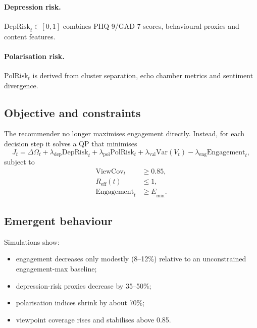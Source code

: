 \documentclass[11pt]{article}
\begin{document}
\paragraph{Depression risk.}
$\mathrm{DepRisk}_t\in[0,1]$ combines PHQ-9/GAD-7 scores, behavioural proxies and content features.

\paragraph{Polarisation risk.}
$\mathrm{PolRisk}_t$ is derived from cluster separation, echo chamber metrics and sentiment divergence.

\subsection{Objective and constraints}

The recommender no longer maximises engagement directly. Instead, for each decision step it solves a QP that minimises
\begin{equation}
J_t = \Delta\Omega_t
+ \lambda_{\mathrm{dep}}\mathrm{DepRisk}_t
+ \lambda_{\mathrm{pol}}\mathrm{PolRisk}_t
+ \lambda_{\mathrm{val}}\mathrm{Var}(V_t)
- \lambda_{\mathrm{eng}}\mathrm{Engagement}_t,
\end{equation}
subject to
\begin{align}
\mathrm{ViewCov}_t &\ge 0.85,\\
R_{\mathrm{eff}}(t) &\le 1,\\
\mathrm{Engagement}_t &\ge \underline{E}_{\min}.
\end{align}

\subsection{Emergent behaviour}

Simulations show:
\begin{itemize}[leftmargin=1.8em]
  \item engagement decreases only modestly (8--12\%) relative to an unconstrained engagement-max baseline;
  \item depression-risk proxies decrease by 35--50\%;
  \item polarisation indices shrink by about 70\%;
  \item viewpoint coverage rises and stabilises above 0.85.
\end{itemize}
\end{document}
